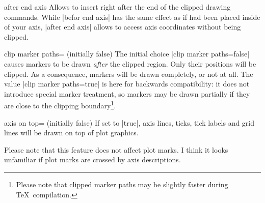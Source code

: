 \begin{pgfplotscodekey}{after end axis}
Allows to insert  right after the end of the clipped drawing commands. While |befor end axis| has the same effect as if  had been placed inside of your axis, |after end axis| allows to access axis coordinates without being clipped.
\begin{codeexample}[]
\end{codeexample}
\end{pgfplotscodekey}

\begin{pgfplotskey}{clip marker paths= (initially false)}
	The initial choice |clip marker paths=false| causes markers to be drawn \emph{after} the clipped region. Only their positions will be clipped. As a consequence, markers will be drawn completely, or not at all. The value |clip marker paths=true| is here for backwards compatibility: it does not introduce special marker treatment, so markers may be drawn partially if they are close to the clipping boundary\footnote{Please note that clipped marker paths may be slightly faster during \TeX\ compilation.}.
\end{pgfplotskey}

\begin{pgfplotskey}{axis on top= (initially false)}
	If set to |true|, axis lines, ticks, tick labels and grid lines will be drawn on top of plot graphics.
\begin{codeexample}[]
\end{codeexample}

\begin{codeexample}[]
\end{codeexample}
Please note that this feature does not affect plot marks. I think it looks unfamiliar if plot marks are crossed by axis descriptions.
\end{pgfplotskey}
